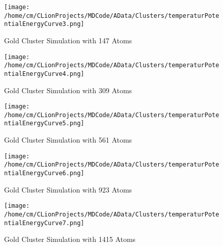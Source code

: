\begin{figure}[!h] 
    \begin{center} 
        \texttt{[image: /home/cm/CLionProjects/MDCode/AData/Clusters/temperaturPotentialEnergyCurve3.png]} 
    \end{center} 
    \caption[Gold Cluster Simulation with 147 Atoms]{Gold Cluster Simulation with 147 Atoms} 
    \label{GoldClusterSimulationTemperaturEnergy147} 
\end{figure} 
 
\begin{figure}[!h] 
    \begin{center} 
        \texttt{[image: /home/cm/CLionProjects/MDCode/AData/Clusters/temperaturPotentialEnergyCurve4.png]} 
    \end{center} 
    \caption[Gold Cluster Simulation with 309 Atoms]{Gold Cluster Simulation with 309 Atoms} 
    \label{GoldClusterSimulationTemperaturEnergy309} 
\end{figure} 
 
\begin{figure}[!h] 
    \begin{center} 
        \texttt{[image: /home/cm/CLionProjects/MDCode/AData/Clusters/temperaturPotentialEnergyCurve5.png]} 
    \end{center} 
    \caption[Gold Cluster Simulation with 561 Atoms]{Gold Cluster Simulation with 561 Atoms} 
    \label{GoldClusterSimulationTemperaturEnergy561} 
\end{figure} 
 
\begin{figure}[!h] 
    \begin{center} 
        \texttt{[image: /home/cm/CLionProjects/MDCode/AData/Clusters/temperaturPotentialEnergyCurve6.png]} 
    \end{center} 
    \caption[Gold Cluster Simulation with 923 Atoms]{Gold Cluster Simulation with 923 Atoms} 
    \label{GoldClusterSimulationTemperaturEnergy923} 
\end{figure} 
 
\begin{figure}[!h] 
    \begin{center} 
        \texttt{[image: /home/cm/CLionProjects/MDCode/AData/Clusters/temperaturPotentialEnergyCurve7.png]} 
    \end{center} 
    \caption[Gold Cluster Simulation with 1415 Atoms]{Gold Cluster Simulation with 1415 Atoms} 
    \label{GoldClusterSimulationTemperaturEnergy1415} 
\end{figure} 
 
